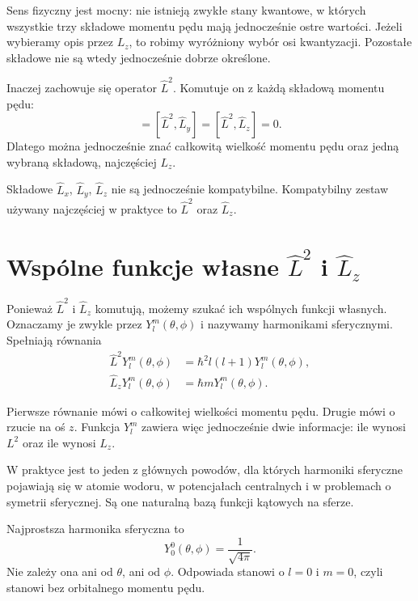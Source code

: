 Sens fizyczny jest mocny: nie istnieją zwykłe stany kwantowe, w których wszystkie trzy składowe momentu pędu mają jednocześnie ostre wartości. Jeżeli wybieramy opis przez \(L_z\), to robimy wyróżniony wybór osi kwantyzacji. Pozostałe składowe nie są wtedy jednocześnie dobrze określone.

Inaczej zachowuje się operator \(\hat{L}^2\). Komutuje on z każdą składową momentu pędu:
\begin{equation}
    [\hat{L}^2,\hat{L}_x]=[\hat{L}^2,\hat{L}_y]=[\hat{L}^2,\hat{L}_z]=0.
\end{equation}
Dlatego można jednocześnie znać całkowitą wielkość momentu pędu oraz jedną wybraną składową, najczęściej \(L_z\).

\begin{summarybox}
Składowe \(\hat{L}_x\), \(\hat{L}_y\), \(\hat{L}_z\) nie są jednocześnie kompatybilne. Kompatybilny zestaw używany najczęściej w praktyce to \(\hat{L}^2\) oraz \(\hat{L}_z\).
\end{summarybox}

\section{Wspólne funkcje własne \texorpdfstring{\(\hat{L}^2\)}{L2} i \texorpdfstring{\(\hat{L}_z\)}{Lz}}

Ponieważ \(\hat{L}^2\) i \(\hat{L}_z\) komutują, możemy szukać ich wspólnych funkcji własnych. Oznaczamy je zwykle przez \(Y_l^m(\theta,\phi)\) i nazywamy harmonikami sferycznymi. Spełniają równania
\begin{align}
    \hat{L}^2 Y_l^m(\theta,\phi)
    &=\hbar^2 l(l+1)Y_l^m(\theta,\phi), \\
    \hat{L}_z Y_l^m(\theta,\phi)
    &=\hbar m Y_l^m(\theta,\phi).
\end{align}

Pierwsze równanie mówi o całkowitej wielkości momentu pędu. Drugie mówi o rzucie na oś \(z\). Funkcja \(Y_l^m\) zawiera więc jednocześnie dwie informacje: ile wynosi \(L^2\) oraz ile wynosi \(L_z\).

W praktyce jest to jeden z głównych powodów, dla których harmoniki sferyczne pojawiają się w atomie wodoru, w potencjałach centralnych i w problemach o symetrii sferycznej. Są one naturalną bazą funkcji kątowych na sferze.

\begin{examplebox}
Najprostsza harmonika sferyczna to
\[
    Y_0^0(\theta,\phi)=\frac{1}{\sqrt{4\pi}}.
\]
Nie zależy ona ani od \(\theta\), ani od \(\phi\). Odpowiada stanowi o \(l=0\) i \(m=0\), czyli stanowi bez orbitalnego momentu pędu.
\end{examplebox}

